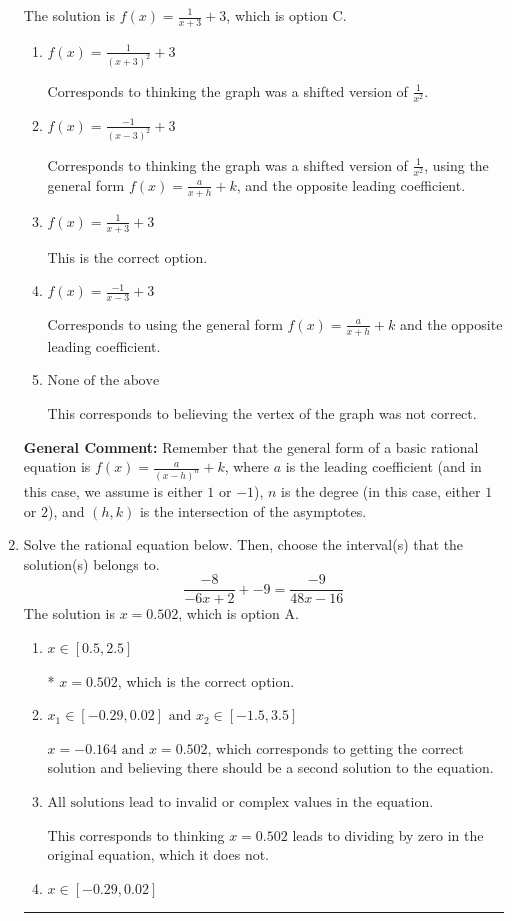 \documentclass{extbook}[14pt]
\newcommand{\litem}[1]{\item #1

\rule{\textwidth}{0.4pt}}
\begin{document}
\begin{enumerate}
{The solution is \( f(x) = \frac{1}{x + 3} + 3 \), which is option C.\begin{enumerate}[label=\Alph*.]
\item \( f(x) = \frac{1}{(x + 3)^2} + 3 \)

Corresponds to thinking the graph was a shifted version of $\frac{1}{x^2}$.
\item \( f(x) = \frac{-1}{(x - 3)^2} + 3 \)

Corresponds to thinking the graph was a shifted version of $\frac{1}{x^2}$, using the general form $f(x) = \frac{a}{x+h}+k$, and the opposite leading coefficient.
\item \( f(x) = \frac{1}{x + 3} + 3 \)

This is the correct option.
\item \( f(x) = \frac{-1}{x - 3} + 3 \)

Corresponds to using the general form $f(x) = \frac{a}{x+h}+k$ and the opposite leading coefficient.
\item \( \text{None of the above} \)

This corresponds to believing the vertex of the graph was not correct.
\end{enumerate}

\textbf{General Comment:} Remember that the general form of a basic rational equation is $ f(x) = \frac{a}{(x-h)^n} + k$, where $a$ is the leading coefficient (and in this case, we assume is either $1$ or $-1$), $n$ is the degree (in this case, either $1$ or $2$), and $(h, k)$ is the intersection of the asymptotes.
}
\litem{
Solve the rational equation below. Then, choose the interval(s) that the solution(s) belongs to.
\[ \frac{-8}{-6x + 2} + -9 = \frac{-9}{48x -16} \]The solution is \( x = 0.502 \), which is option A.\begin{enumerate}[label=\Alph*.]
\item \( x \in [0.5,2.5] \)

* $x = 0.502$, which is the correct option.
\item \( x_1 \in [-0.29, 0.02] \text{ and } x_2 \in [-1.5,3.5] \)

$x = -0.164 \text{ and } x = 0.502$, which corresponds to getting the correct solution and believing there should be a second solution to the equation.
\item \( \text{All solutions lead to invalid or complex values in the equation.} \)

This corresponds to thinking $x = 0.502$ leads to dividing by zero in the original equation, which it does not.
\item \( x \in [-0.29,0.02] \)


\end{enumerate}}
\end{enumerate}
\end{document}
